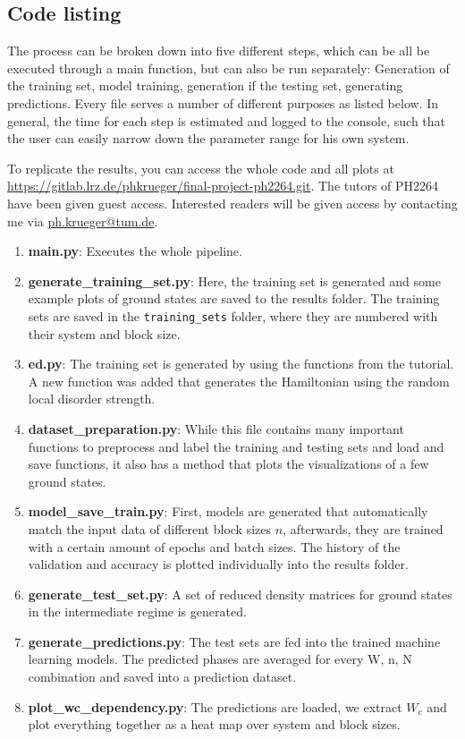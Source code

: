 \documentclass[reprint,amsmath,amssymb,aps,prb]{revtex4-2}
\begin{document}


\newpage
\appendix


\begin{widetext}
\section{Code listing} \label{app:codes}
The process can be broken down into five different steps, which can be all be executed through a main function, but can also be run separately: Generation of the training set, model training, generation if the testing set, generating predictions. Every file serves a number of different purposes as listed below. In general, the time for each step is estimated and logged to the console, such that the user can easily narrow down the parameter range for his own system.

To replicate the results, you can access the whole code and all plots at \url{https://gitlab.lrz.de/phkrueger/final-project-ph2264.git}. The tutors of PH2264 have been given guest access. Interested readers will be given access by contacting me via \url{ph.krueger@tum.de}.

\begin{enumerate}
	\item \textbf{main.py}: Executes the whole pipeline.
	\item \textbf{generate\_training\_set.py}: Here, the training set is generated and some example plots of ground states are saved to the results folder. The training sets are saved in the \texttt{training\_sets} folder, where they are numbered with their system and block size.
	\item \textbf{ed.py}: The training set is generated by using the functions from the tutorial. A new function was added that generates the Hamiltonian using the random local disorder strength.
	\item \textbf{dataset\_preparation.py}: While this file contains many important functions to preprocess and label the training and testing sets and load and save functions, it also has a method that plots the visualizations of a few ground states.
	\item \textbf{model\_save\_train.py}: First, models are generated that automatically match the input data of different block sizes $n$, afterwards, they are trained with a certain amount of epochs and batch sizes. The history of the validation and accuracy is plotted individually into the results folder.
	\item \textbf{generate\_test\_set.py}: A set of reduced density matrices for ground states in the intermediate regime is generated.
	\item \textbf{generate\_predictions.py}: The test sets are fed into the trained machine learning models. The predicted phases are averaged for every W, n, N combination and saved into a prediction dataset.
	\item \textbf{plot\_wc\_dependency.py}: The predictions are loaded, we extract $W_c$ and plot everything together as a heat map over system and block sizes.
\end{enumerate}


\end{widetext}
\end{document}
